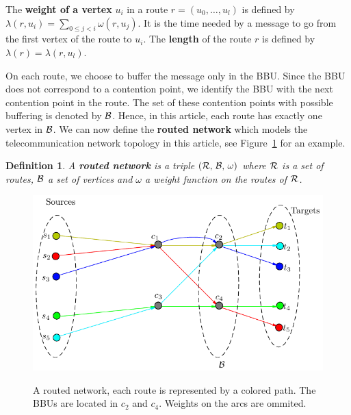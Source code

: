 \documentclass[a4paper,10pt]{journal}
\newtheorem{definition}{Definition}
\begin{document}
    The {\bf weight of a vertex} $u_i$ in a route $r=(u_0,\dots,u_l)$ is defined by $\lambda(r,u_i)= \sum\limits_{0 \leq j <i} \omega(r,u_j)$. It is the time needed by a message to go from the first vertex of the route to $u_i$. The \textbf{length} of the route $r$ is defined by $\lambda(r)= \lambda(r,u_l)$. 

  	On each route, we choose to buffer the message only in the BBU. Since the BBU does not correspond to a contention point, we identify the BBU with the next contention point in the route. The set of these contention points with possible buffering is denoted by ${\cal B}$. Hence, in this article, each route has exactly one vertex in $\cal{B}$. We can now define the \textbf{routed network} which models the telecommunication network topology in this article, see Figure~\ref{fig:graphmodel} for an example. 


  	\begin{definition}
    A \textbf{routed network} is a triple $(\cal{R},\,\cal{B},\,\omega)$ where $\cal{R}$ is a set of routes, $\cal{B}$ a set of vertices and $\omega$ a weight function on the routes of $\cal{R}$. 
    \end{definition}
     


\begin{figure}
\centering

	
	\includegraphics[scale=0.7]{graphmodel}\\

\caption{A routed network, each route is represented by a colored path. The BBUs are located in $c_2$ and $c_4$. Weights on the arcs are ommited.}
\label{fig:graphmodel}
\end{figure} 
 
\end{document}
